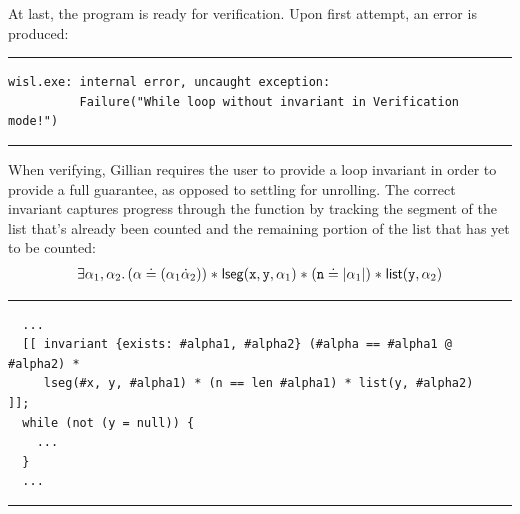 At last, the program is ready for verification. Upon first attempt, an error is
produced:
\noindent\rule{\textwidth}{0.5pt}
\vspace{-0.6cm}
\begin{verbatim}
wisl.exe: internal error, uncaught exception:
          Failure("While loop without invariant in Verification mode!")
\end{verbatim}
\vspace{-0.4cm}
\noindent\rule{\textwidth}{0.5pt}
\vspace{-0.6cm}
\vspace{0.5cm}

When verifying, Gillian requires the user to provide a loop invariant in order
to provide a full guarantee, as opposed to settling for unrolling. The correct
invariant captures progress through the function by tracking the segment of the
list that's already been counted and the remaining portion of the list that has
yet to be counted:
\begin{align*}
    \exists \alpha_1, \alpha_2 \ldotp (\alpha \doteq (\alpha_1 \dot \alpha_2)) \mathrel{*} \mathsf{lseg}(\mathtt{x}, \mathtt{y}, \alpha_1) \mathrel{*} (\mathtt{n} \doteq | \alpha_1 |) \mathrel{*} \mathsf{list}(\mathtt{y}, \alpha_2)
\end{align*}

\noindent\rule{\textwidth}{0.5pt}
\vspace{-0.6cm}
\begin{verbatim}
  ...
  [[ invariant {exists: #alpha1, #alpha2} (#alpha == #alpha1 @ #alpha2) * 
     lseg(#x, y, #alpha1) * (n == len #alpha1) * list(y, #alpha2)         ]];
  while (not (y = null)) {
    ...
  }
  ...
\end{verbatim}
\vspace{-0.4cm}
\noindent\rule{\textwidth}{0.5pt}
\vspace{-0.6cm}
~
\label{lst:debug-old-inv}
\vspace{0.5cm}

